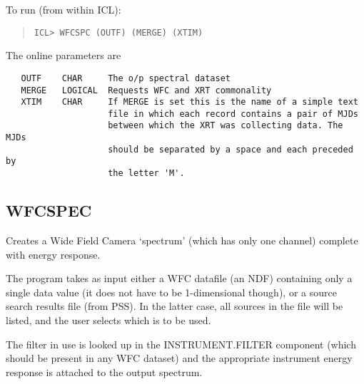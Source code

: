 \documentclass{book}
\renewcommand{\_}{{\tt\char'137}}     %
\begin{document}
To run (from within ICL):
\begin{quote}\begin{verbatim}
ICL> WFCSPC (OUTF) (MERGE) (XTIM)
\end{verbatim}\end{quote}
The online parameters are
\begin{verbatim}
   OUTF    CHAR     The o/p spectral dataset
   MERGE   LOGICAL  Requests WFC and XRT commonality
   XTIM    CHAR     If MERGE is set this is the name of a simple text
                    file in which each record contains a pair of MJDs
                    between which the XRT was collecting data. The MJDs
                    should be separated by a space and each preceded by
                    the letter 'M'.
\end{verbatim}
\subsection{WFCSPEC}
Creates a Wide Field Camera `spectrum' (which has only one
channel) complete with energy response.

The program takes as input either a WFC datafile (an NDF)
containing only a single data value (it does not have to
be 1-dimensional though), or a source search
results file (from PSS). In the latter case, all sources
in the file will be listed, and the user selects which
is to be used.

The filter in use is looked up in the INSTRUMENT.FILTER
component (which should be present in any WFC dataset)
and the appropriate instrument energy response is attached
to the output spectrum.
\end{document}
